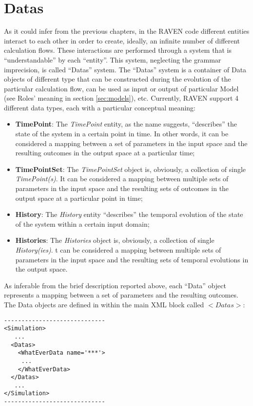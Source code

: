 \section{Datas  \\ \vspace{2 mm} {\small }}
\label{sec:Datas}
As it could infer from the previous chapters,  in the RAVEN code different entities interact to each other in order to create, ideally, an infinite number of different calculation flows. These interactions are performed through a system that is ``understandable'' by each ``entity''. This system, neglecting the grammar imprecision,  is called ``Datas'' system. The ``Datas'' system is a container of Data objects of different type that can be constructed during the evolution of the particular calculation flow, can be used as input or output of particular Model (see Roles' meaning in section \ref{sec:models}), etc. 
Currently, RAVEN support 4 different data types, each with a particular conceptual meaning:
\begin{itemize}
\item \textbf{TimePoint}: The \textit{TimePoint} entity, as the name suggests, ``describes'' the state of the system in a certain point in time. In other words, it can be considered a mapping between a set of parameters in the input space and the resulting outcomes in the output space at a particular time;
\item \textbf{TimePointSet}: The \textit{TimePointSet} object is, obviously, a collection of single \textit{TimePoint(s)}. It can be considered a mapping between multiple sets of parameters in the input space and the resulting sets of outcomes in the output space at a particular point in time;
\item \textbf{History}:  The \textit{History} entity ``describes'' the temporal evolution of the state of the system within a certain input domain;
\item \textbf{Histories}:  The \textit{Histories} object is, obviously, a collection of single \textit{History(ies)}. t can be considered a mapping between multiple sets of parameters in the input space and the resulting sets of temporal evolutions in the output space.
\end{itemize}
As inferable  from the brief description reported above, each ``Data'' object represents a mapping between a set of parameters and the resulting outcomes.
The Data objects are defined in within the main XML block called $<Datas>$:
\begin{lstlisting}[style=XML]
-----------------------------
<Simulation>
   ...
  <Datas> 
    <WhatEverData name='***'>  
     ... 
    </WhatEverData> 
  </Datas>
   ...
</Simulation>
-----------------------------
\end{lstlisting}

